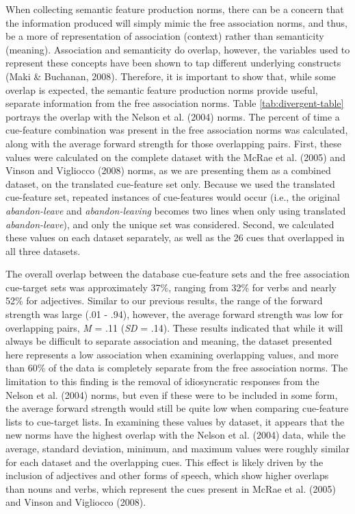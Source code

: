 \documentclass[english,,man]{apa6}
\theoremstyle{definition}
\theoremstyle{definition}
\theoremstyle{definition}
\theoremstyle{remark}
\begin{document}
When collecting semantic feature production norms, there can be a
concern that the information produced will simply mimic the free
association norms, and thus, be a more of representation of association
(context) rather than semanticity (meaning). Association and semanticity
do overlap, however, the variables used to represent these concepts have
been shown to tap different underlying constructs (Maki \& Buchanan,
2008). Therefore, it is important to show that, while some overlap is
expected, the semantic feature production norms provide useful, separate
information from the free association norms. Table
\ref{tab:divergent-table} portrays the overlap with the Nelson et al.
(2004) norms. The percent of time a cue-feature combination was present
in the free association norms was calculated, along with the average
forward strength for those overlapping pairs. First, these values were
calculated on the complete dataset with the McRae et al. (2005) and
Vinson and Vigliocco (2008) norms, as we are presenting them as a
combined dataset, on the translated cue-feature set only. Because we
used the translated cue-feature set, repeated instances of cue-features
would occur (i.e., the original \emph{abandon-leave} and
\emph{abandon-leaving} becomes two lines when only using translated
\emph{abandon-leave}), and only the unique set was considered. Second,
we calculated these values on each dataset separately, as well as the 26
cues that overlapped in all three datasets.

The overall overlap between the database cue-feature sets and the free
association cue-target sets was approximately 37\%, ranging from 32\%
for verbs and nearly 52\% for adjectives. Similar to our previous
results, the range of the forward strength was large (.01 - .94),
however, the average forward strength was low for overlapping pairs,
\emph{M} = .11 (\emph{SD} = .14). These results indicated that while it
will always be difficult to separate association and meaning, the
dataset presented here represents a low association when examining
overlapping values, and more than 60\% of the data is completely
separate from the free association norms. The limitation to this finding
is the removal of idiosyncratic responses from the Nelson et al. (2004)
norms, but even if these were to be included in some form, the average
forward strength would still be quite low when comparing cue-feature
lists to cue-target lists. In examining these values by dataset, it
appears that the new norms have the highest overlap with the Nelson et
al. (2004) data, while the average, standard deviation, minimum, and
maximum values were roughly similar for each dataset and the overlapping
cues. This effect is likely driven by the inclusion of adjectives and
other forms of speech, which show higher overlaps than nouns and verbs,
which represent the cues present in McRae et al. (2005) and Vinson and
Vigliocco (2008).
\end{document}
